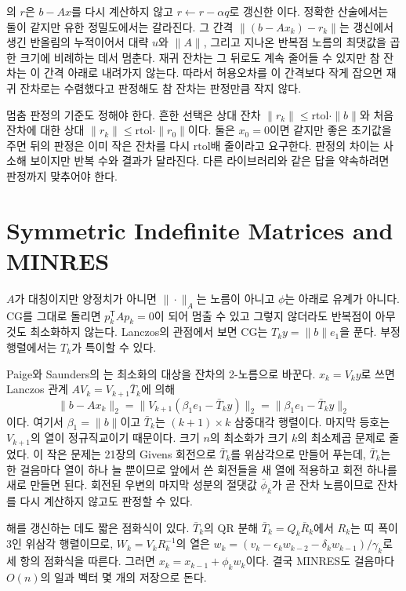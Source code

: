 의 $r$은 $b-Ax$를 다시 계산하지 않고 $r\gets r-\alpha q$로 갱신한 이다. 정확한 산술에서는 둘이 같지만 유한 정밀도에서는 갈라진다. 그 간격 $\|(b-Ax_k)-r_k\|$는 갱신에서 생긴 반올림의 누적이어서 대략 $u$와 $\|A\|$, 그리고 지나온 반복점 노름의 최댓값을 곱한 크기에 비례하는 데서 멈춘다\cite{greenbaum1997iterative}. 재귀 잔차는 그 뒤로도 계속 줄어들 수 있지만 참 잔차는 이 간격 아래로 내려가지 않는다. 따라서 허용오차를 이 간격보다 작게 잡으면 재귀 잔차로는 수렴했다고 판정해도 참 잔차는 판정만큼 작지 않다.

멈춤 판정의 기준도 정해야 한다. 흔한 선택은 상대 잔차 $\|r_k\|\le\mathrm{rtol}\cdot\|b\|$와 처음 잔차에 대한 상대 $\|r_k\|\le\mathrm{rtol}\cdot\|r_0\|$이다. 둘은 $x_0=0$이면 같지만 좋은 초기값을 주면 뒤의 판정은 이미 작은 잔차를 다시 $\mathrm{rtol}$배 줄이라고 요구한다. 판정의 차이는 사소해 보이지만 반복 수와 결과가 달라진다. 다른 라이브러리와 같은 답을 약속하려면 판정까지 맞추어야 한다.

\section{Symmetric Indefinite Matrices and MINRES}
\label{sec:minres}

$A$가 대칭이지만 양정치가 아니면 $\|\cdot\|_A$는 노름이 아니고 $\phi$는 아래로 유계가 아니다. CG를 그대로 돌리면 $p_k^{\mathsf T}Ap_k=0$이 되어 멈출 수 있고 그렇지 않더라도 반복점이 아무것도 최소화하지 않는다. Lanczos의 관점에서 보면 CG는 $T_ky=\|b\|e_1$을 푼다. 부정 행렬에서는 $T_k$가 특이할 수 있다.

Paige와 Saunders의 는 최소화의 대상을 잔차의 2-노름으로 바꾼다\cite{paige1975}. $x_k=V_ky$로 쓰면 Lanczos 관계 $AV_k=V_{k+1}\bar T_k$에 의해
\[
\|b-Ax_k\|_2=\|V_{k+1}(\beta_1e_1-\bar T_ky)\|_2=\|\beta_1e_1-\bar T_ky\|_2
\]
이다. 여기서 $\beta_1=\|b\|$이고 $\bar T_k$는 $(k+1)\times k$ 삼중대각 행렬이다. 마지막 등호는 $V_{k+1}$의 열이 정규직교이기 때문이다. 크기 $n$의 최소화가 크기 $k$의 최소제곱 문제로 줄었다. 이 작은 문제는 21장의 Givens 회전으로 $\bar T_k$를 위삼각으로 만들어 푸는데, $\bar T_k$는 한 걸음마다 열이 하나 늘 뿐이므로 앞에서 쓴 회전들을 새 열에 적용하고 회전 하나를 새로 만들면 된다. 회전된 우변의 마지막 성분의 절댓값 $\bar\phi_k$가 곧 잔차 노름이므로 잔차를 다시 계산하지 않고도 판정할 수 있다.

해를 갱신하는 데도 짧은 점화식이 있다. $\bar T_k$의 QR 분해 $\bar T_k=Q_k\bar R_k$에서 $R_k$는 띠 폭이 $3$인 위삼각 행렬이므로, $W_k=V_kR_k^{-1}$의 열은 $w_k=(v_k-\epsilon_kw_{k-2}-\delta_kw_{k-1})/\gamma_k$로 세 항의 점화식을 따른다. 그러면 $x_k=x_{k-1}+\phi_kw_k$이다. 결국 MINRES도 걸음마다 $O(n)$의 일과 벡터 몇 개의 저장으로 돈다.

